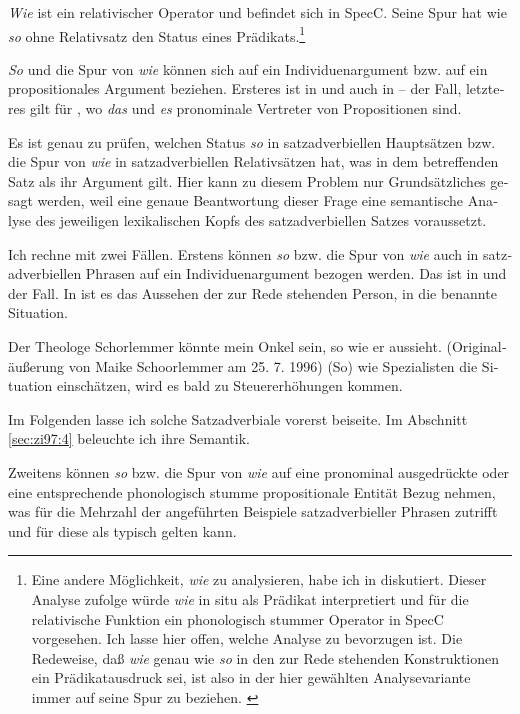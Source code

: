 \documentclass[output=paper, colorlinks, citecolor=brown, booklanguage=german]{langscibook}
\begin{document}
\begin{otherlanguage}{german}
\textit{Wie} ist ein relativischer Operator und befindet sich in SpecC. Seine Spur hat wie \textit{so} ohne Relativsatz den Status eines Prädikats.\footnote{Eine andere Möglichkeit, \textit{wie} zu analysieren, habe ich in \citet{zimmermann1995bausteine} diskutiert. Dieser Analyse zufolge würde \textit{wie} in situ als Prädikat interpretiert und für die relativische Funktion ein phonologisch stummer Operator in SpecC vorgesehen. Ich lasse hier offen, welche Analyse zu bevorzugen ist. Die Redeweise, daß \textit{wie} genau wie \textit{so} in den zur Rede stehenden Konstruktionen ein Prädikatausdruck sei, ist also in der hier gewählten Analysevariante immer auf seine Spur zu beziehen. \label{footnote8}}

\textit{So} und die Spur von \textit{wie} können sich auf ein Individuenargument bzw. auf ein propositionales Argument beziehen. Ersteres ist in  und auch in -- der Fall, letzteres gilt für , wo \textit{das} und \textit{es} pronominale Vertreter von Propositionen sind.

Es ist genau zu prüfen, welchen Status \textit{so} in satzadverbiellen Hauptsätzen bzw. die Spur von \textit{wie} in satzadverbiellen Relativsätzen hat, was in dem betreffenden Satz als ihr Argument gilt. Hier kann zu diesem Problem nur Grundsätzliches gesagt werden, weil eine genaue Beantwortung dieser Frage eine semantische Analyse des jeweiligen lexikalischen Kopfs des satzadverbiellen Satzes voraussetzt.

Ich rechne mit zwei Fällen. Erstens können \textit{so} bzw. die Spur von \textit{wie} auch in satzadverbiellen Phrasen auf ein Individuenargument bezogen werden. Das ist in  und  der Fall. In  ist es das Aussehen der zur Rede stehenden Person, in  die benannte Situation.

\ea \label{ex:zi97:39} Der Theologe Schorlemmer könnte mein Onkel sein, so wie er aussieht. (Originaläußerung von Maike Schoorlemmer am 25. 7. 1996)
\ex \label{ex:zi97:40} (So) wie Spezialisten die Situation einschätzen, wird es bald zu Steuererhöhungen kommen.
\z

\noindent Im Folgenden lasse ich solche Satzadverbiale vorerst beiseite. Im Abschnitt \ref{sec:zi97:4} beleuchte ich ihre Semantik.

Zweitens können \textit{so} bzw. die Spur von \textit{wie} auf eine pronominal ausgedrückte oder eine entsprechende phonologisch stumme propositionale Entität Bezug nehmen, was für die Mehrzahl der angeführten Beispiele satzadverbieller Phrasen zutrifft und für diese als typisch gelten kann.


\end{otherlanguage}
\end{document}
